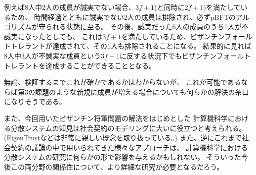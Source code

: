 例えば8人中2人の成員が誠実でない場合、$3f+1$(と同時に$2f+1$)を満たしているため、
時間経過とともに誠実でない2人の成員は排除され、必ずpBFTのアルゴリズムが守られる状態に至る。
その後、誠実だった6人の成員のうち1人が不誠実になったとしても、
これは$3f+1$を満たしているため、ビザンチンフォールトトレラントが達成されて、その1人も排除されることになる。
結果的に見れば8人中3人が不誠実な成員という$3f+1$に反する状況下でもビザンチンフォールトトレラントを達成することができることとなる。

無論、検証するまでこれが確かであるかはわからないが、
これが可能であるならば第3の課題のような新規に成員が増える場合についても何らかの解決の糸口になりそうである。

また、今回用いたビザンチン将軍問題の解法をはじめとした
計算機科学における分散システムの知見は社会契約のモデリングに大いに役立つと考えられる。
(EigenTrust\cite{kamvar2003}などは非常に親しい概念を取り扱っている。)
また、逆にこれまで社会契約の議論の中で用いられてきた様々なアプローチは、
計算機科学における分散システムの研究に何らかの形で影響を与えるかもしれない。
そういった今後この両分野の関係性について、より詳細な研究が必要となるだろう。
